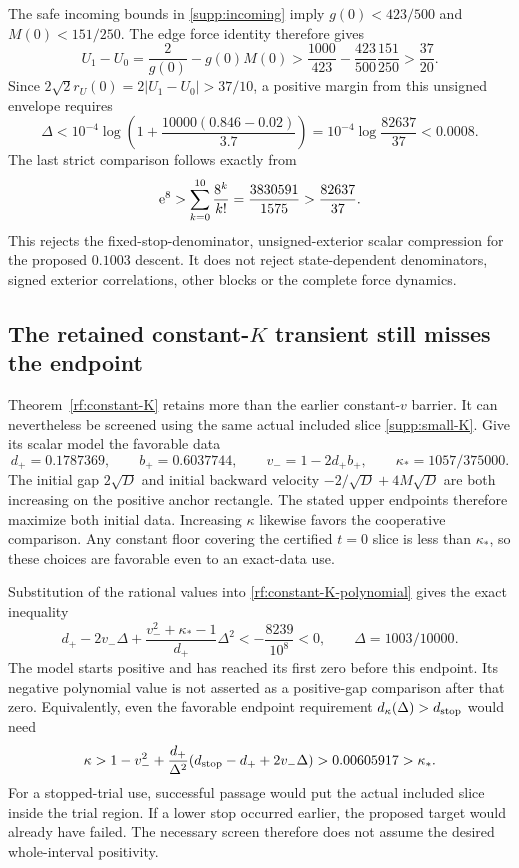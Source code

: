 The safe incoming bounds in \eqref{supp:incoming} imply
$g(0)<423/500$ and $M(0)<151/250$. The edge force identity therefore
gives
\[
 U_1-U_0=\frac2{g(0)}-g(0)M(0)
  >\frac{1000}{423}-\frac{423}{500}\frac{151}{250}
  >\frac{37}{20}.
\]
Since $2\sqrt2r_U(0)=2|U_1-U_0|>37/10$, a positive margin from this
unsigned envelope requires
\begin{equation}
 \Delta<10^{-4}\log\left(1+
       \frac{10000(0.846-0.02)}{3.7}\right)
       =10^{-4}\log\frac{82637}{37}<0.0008.
 \label{supp:force-duration}
\end{equation}
The last strict comparison follows exactly from
\[
 \mathrm e^8>\sum_{k=0}^{10}\frac{8^k}{k!}
       =\frac{3830591}{1575}>\frac{82637}{37}.
\]
This rejects the fixed-stop-denominator, unsigned-exterior scalar
compression for the proposed $0.1003$ descent. It does not reject
state-dependent denominators, signed exterior correlations, other blocks
or the complete force dynamics.

\subsection{The retained constant-\texorpdfstring{$K$}{K} transient still misses the endpoint}
\label{supp:constant-K-transient}

Theorem~\ref{rf:constant-K} retains more than the earlier constant-$v$
barrier. It can nevertheless be screened using the same actual included
slice \eqref{supp:small-K}. Give its scalar model the favorable data
\[
 d_+=0.1787369,\qquad b_+=0.6037744,\qquad
 v_-=1-2d_+b_+,\qquad \kappa_*=1057/375000.
\]
The initial gap $2\sqrt D$ and initial backward velocity
$-2/\sqrt D+4M\sqrt D$ are both increasing on the positive anchor
rectangle. The stated upper endpoints therefore maximize both initial
data. Increasing $\kappa$ likewise favors the cooperative comparison.
Any constant floor covering the certified $t=0$ slice is less than
$\kappa_*$, so these choices are favorable even to an exact-data use.

Substitution of the rational values into
\eqref{rf:constant-K-polynomial} gives the exact inequality
\begin{equation}
 d_+-2v_-\Delta+
       \frac{v_-^2+\kappa_*-1}{d_+}\Delta^2
       <-\frac{8239}{10^8}<0,
 \qquad \Delta=1003/10000.
 \label{supp:transient-failure}
\end{equation}
The model starts positive and has reached its first zero before this
endpoint. Its negative polynomial value is not asserted as a
positive-gap comparison after that zero. Equivalently, even the
favorable endpoint requirement $d_\kappa(\Delta)>d_{\rm stop}$ would
need
\[
 \kappa>
 1-v_-^2+\frac{d_+}{\Delta^2}
       (d_{\rm stop}-d_++2v_-\Delta)
 >0.00605917>\kappa_*.
\]
For a stopped-trial use, successful passage would put the actual included
slice inside the trial region. If a lower stop occurred earlier, the
proposed target would already have failed. The necessary screen therefore
does not assume the desired whole-interval positivity.

